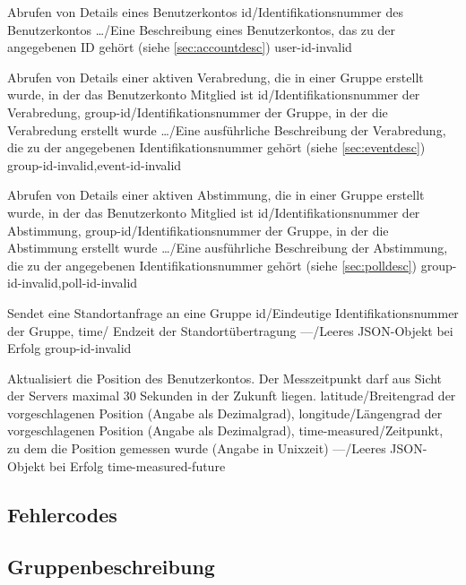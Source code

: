 \documentclass[parskip=full,11pt]{scrartcl}
\begin{document}
{Abrufen von Details eines Benutzerkontos}
{id/Identifikationsnummer des Benutzerkontos}
{\dots/Eine Beschreibung eines Benutzerkontos{,} das zu der angegebenen
ID gehört (siehe \ref{sec:accountdesc})}
{user-id-invalid}

{Abrufen von Details einer aktiven Verabredung, die in einer Gruppe erstellt
wurde, in der das Benutzerkonto Mitglied ist}
{id/Identifikationsnummer der Verabredung,
group-id/Identifikationsnummer der Gruppe{,} in der die Verabredung erstellt
wurde}
{\dots/Eine ausführliche Beschreibung der Verabredung{,} die zu der angegebenen
Identifikationsnummer gehört (siehe \ref{sec:eventdesc})}
{group-id-invalid,event-id-invalid}

{Abrufen von Details einer aktiven Abstimmung, die in einer Gruppe erstellt
wurde, in der das Benutzerkonto Mitglied ist}
{id/Identifikationsnummer der Abstimmung,
group-id/Identifikationsnummer der Gruppe{,} in der die Abstimmung erstellt
wurde}
{\dots/Eine ausführliche Beschreibung der Abstimmung{,} die zu der angegebenen
Identifikationsnummer gehört (siehe \ref{sec:polldesc})}
{group-id-invalid,poll-id-invalid}

{Sendet eine Standortanfrage an eine Gruppe}
{id/Eindeutige Identifikationsnummer der Gruppe,
time/ Endzeit der Standortübertragung}
{---/Leeres JSON-Objekt bei Erfolg}
{group-id-invalid}

{Aktualisiert die Position des Benutzerkontos.
Der Messzeitpunkt darf aus Sicht der Servers maximal 30 Sekunden in der Zukunft
liegen.}
{latitude/Breitengrad der vorgeschlagenen Position (Angabe als Dezimalgrad),
longitude/Längengrad der vorgeschlagenen Position (Angabe als Dezimalgrad),
time-measured/Zeitpunkt{,} zu dem die Position gemessen wurde (Angabe in
Unixzeit)}
{---/Leeres JSON-Objekt bei Erfolg}
{time-measured-future}

\subsection{Fehlercodes}\label{sec:errorcodes}
\apiErrorTable

\subsection{Gruppenbeschreibung}\label{sec:groupdesc}
\end{document}
